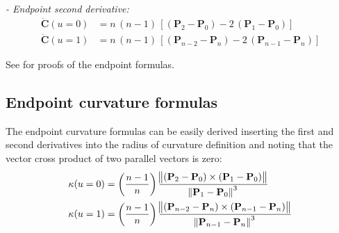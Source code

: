 \textit{- Endpoint second derivative:}
    \begin{align*}
        \mathbf{\ddot{C}}(u=0) &= n\,(n-1) \, \left[ (\mathbf{P}_{2}-\mathbf{P}_{0})  - 2 \, ( \mathbf{P}_{1} - \mathbf{P}_{0}) \right] \\
        \mathbf{\ddot{C}}(u=1) &= n\,(n-1) \, \left[ (\mathbf{P}_{n-2}-\mathbf{P}_{n})  - 2 \, ( \mathbf{P}_{n-1} - \mathbf{P}_{n}) \right]
    \end{align*}

See \textcite[pp.~9--25]{NURBS_book} for proofs of the endpoint formulas.


\subsection{Endpoint curvature formulas}

The endpoint curvature formulas can be easily derived inserting the first and second derivatives into the radius of curvature definition and noting that the vector cross product of two parallel vectors is zero:
\begin{align}
    \label{eq:bezier_curvature_u0}
    \kappa(u=0) &=  \left( \frac{n-1}{n}  \right)
    \frac{\norm{ \left(\mathbf{P}_{2}-\mathbf{P}_{0}\right) \times \left(\mathbf{P}_{1}-\mathbf{P}_{0}\right)} }{\norm{\mathbf{P}_{1}-\mathbf{P}_{0}}^3} \\
    \kappa(u=1) &=  \left( \frac{n-1}{n}  \right) 
    \frac{\norm{ \left(\mathbf{P}_{n-2}-\mathbf{P}_{n}\right) \times \left(\mathbf{P}_{n-1}-\mathbf{P}_{n}\right)} }{\norm{\mathbf{P}_{n-1}-\mathbf{P}_{n}}^3}
    \label{eq:bezier_curvature_u1}
\end{align}
    
